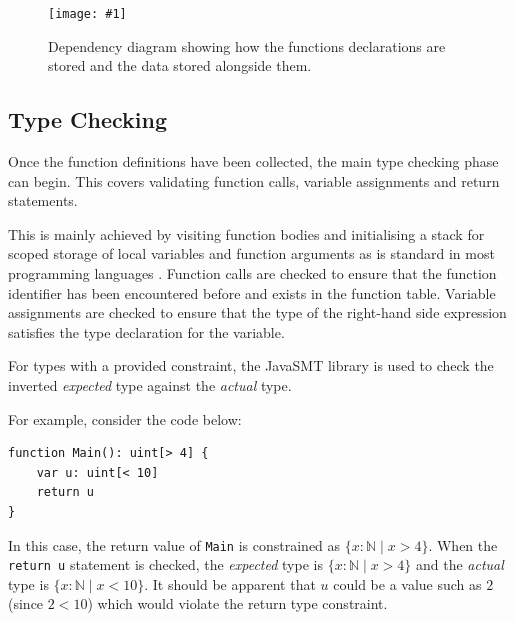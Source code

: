 \documentclass[a4paper]{article}
\newcommand{\widthboxedfigure}[3]{\begin{MyMdframed}\begin{figure}[H]
            \begin{center}\vspace{2em}\texttt{[image: \#1]}\end{center}
            \caption{#2}
\end{figure}\end{MyMdframed}}
\begin{document}
    \widthboxedfigure{FunctionTable.png}{Dependency diagram showing how the functions declarations are stored and the data stored alongside them.}{0.5}
    \pagebreak[5]
    \subsection*{Type Checking}
    
    \hfill{}

    Once the function definitions have been collected, the main type checking phase can begin. This covers validating function calls, variable assignments and return statements.
    
    This is mainly achieved by visiting function bodies and initialising a stack for scoped storage of local variables and function arguments as is standard in most programming languages \citep[p. 88]{watt2004programming}. Function calls are checked to ensure that the function identifier has been encountered before and exists in the function table. Variable assignments are checked to ensure that the type of the right-hand side expression satisfies the type declaration for the variable.
   
    
    For types with a provided constraint, the JavaSMT library is used to check the inverted \emph{expected} type against the \emph{actual} type.
    
    For example, consider the code below:
    
\begin{verbatim}
function Main(): uint[> 4] {
    var u: uint[< 10]
    return u
}
\end{verbatim}


    In this case, the return value of \texttt{Main} is constrained as $\{x: \mathbb{N} \mid{} x > 4\}$. When the \texttt{return u} statement is checked, the \emph{expected} type is $\{x: \mathbb{N} \mid{} x > 4\}$ and the \emph{actual} type is $\{x: \mathbb{N} \mid{} x < 10\}$. It should be apparent that $u$ could be a value such as $2$ (since $2 < 10$) which would violate the return type constraint.
    
\end{document}
